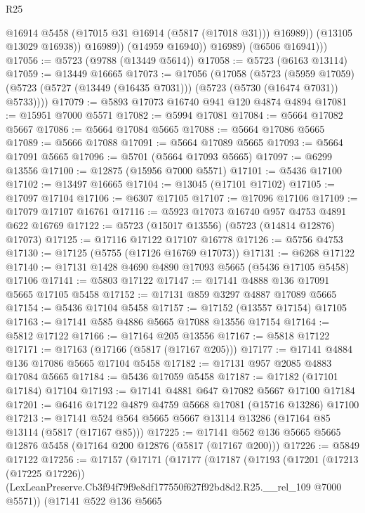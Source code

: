 \begin{lexlean}{R25}
\begin{coremodule}
                      @16914
                      @5458
                      (@17015 @31 @16914 (@5817 (@17018 @31)))
                      @16989))
                  (@13105 @13029 @16938))
                @16989))
            (@14959 @16940))
          @16989)
        (@6506 @16941)))
@17056 := @5723 (@9788 (@13449 @5614))
@17058 := @5723 (@6163 @13114)
@17059 := @13449 @16665
@17073 := @17056
    (@17058
      (@5723
        (@5959 @17059)
        (@5723 (@5727 (@13449 (@16435 @7031))) (@5723 (@5730 (@16474 @7031)) @5733))))
@17079 := @5893 @17073 @16740 @941 @120 @4874 @4894
@17081 := @15951 @7000 @5571
@17082 := @5994 @17081
@17084 := @5664 @17082 @5667
@17086 := @5664 @17084 @5665
@17088 := @5664 @17086 @5665
@17089 := @5666 @17088
@17091 := @5664 @17089 @5665
@17093 := @5664 @17091 @5665
@17096 := @5701 (@5664 @17093 @5665)
@17097 := @6299 @13556
@17100 := @12875 (@15956 @7000 @5571)
@17101 := @5436 @17100
@17102 := @13497 @16665
@17104 := @13045 (@17101 @17102)
@17105 := @17097 @17104
@17106 := @6307 @17105
@17107 := @17096 @17106
@17109 := @17079 @17107 @16761
@17116 := @5923 @17073 @16740 @957 @4753 @4891 @622 @16769
@17122 := @5723 (@15017 @13556) (@5723 (@14814 @12876) @17073)
@17125 := @17116 @17122 @17107 @16778
@17126 := @5756 @4753
@17130 := @17125 (@5755 (@17126 @16769 @17073))
@17131 := @6268 @17122
@17140 := @17131 @1428 @4690 @4890 @17093 @5665 (@5436 @17105 @5458) @17106
@17141 := @5803 @17122
@17147 := @17141 @4888 @136 @17091 @5665 @17105 @5458
@17152 := @17131 @859 @3297 @4887 @17089 @5665
@17154 := @5436 @17104 @5458
@17157 := @17152 (@13557 @17154) @17105
@17163 := @17141 @585 @4886 @5665 @17088 @13556 @17154
@17164 := @5812 @17122
@17166 := @17164 @205 @13556
@17167 := @5818 @17122
@17171 := @17163 (@17166 (@5817 (@17167 @205)))
@17177 := @17141 @4884 @136 @17086 @5665 @17104 @5458
@17182 := @17131 @957 @2085 @4883 @17084 @5665
@17184 := @5436 @17059 @5458
@17187 := @17182 (@17101 @17184) @17104
@17193 := @17141 @4881 @647 @17082 @5667 @17100 @17184
@17201 := @6416 @17122 @4879 @4759 @5668 @17081 (@15716 @13286) @17100
@17213 := @17141 @524 @564 @5665 @5667 @13114 @13286 (@17164 @85 @13114 (@5817 (@17167 @85)))
@17225 := @17141 @562 @136 @5665 @5665 @12876 @5458 (@17164 @200 @12876 (@5817 (@17167 @200)))
@17226 := @5849 @17122
@17256 := @17157
    (@17171
      (@17177
        (@17187
          (@17193
            (@17201
              (@17213 (@17225 @17226))
              (LexLeanPreserve.Cb3f94f79f9e8df177550f627f92bd8d2.R25.__rel_109 @7000 @5571))
            (@17141
              @522
              @136
              @5665

\end{coremodule}
\end{lexlean}
